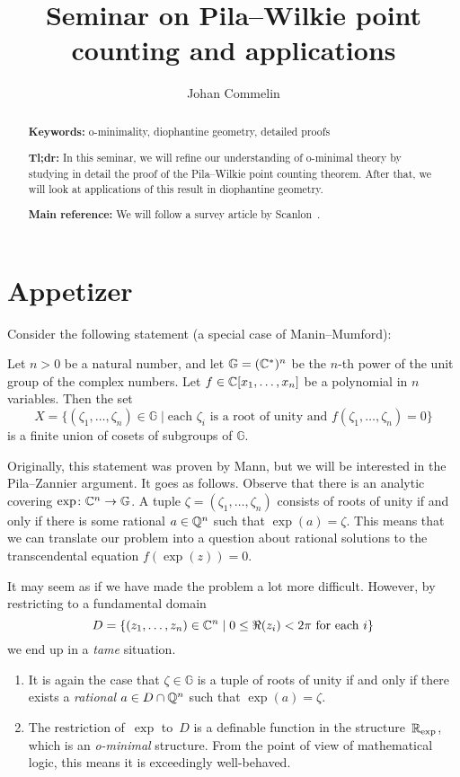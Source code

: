 \documentclass[10pt, a4paper]{amsart}
\title{Seminar on Pila--Wilkie point counting and applications}
\author{Johan Commelin}
\begin{document}
\maketitle

\begin{abstract}
  \textbf{Keywords:}
  o-minimality, diophantine geometry, detailed proofs
  
  \medskip\noindent
  \textbf{Tl;dr:}
  In this seminar,
  we will refine our understanding of o-minimal theory
  by studying in detail the proof of the Pila--Wilkie point counting theorem.
  After that, we will look at applications of this result in diophantine geometry.

  \medskip\noindent
  \textbf{Main reference:}
  We will follow a survey article by Scanlon~\cite{scanlon}.
\end{abstract}

\section*{Appetizer}
Consider the following statement (a special case of Manin--Mumford):

\begin{theorem}
  Let $n > 0$ be a natural number,
  and let $\mathbb G = (\mathbb{C}^*)^n$
  be the $n$-th power of the unit group of the complex numbers.
  Let $f \in \mathbb{C}[x_1, \dots, x_n]$ be a polynomial in $n$ variables.
  Then the set
  \[
    X = \{ (\zeta_1, \dots, \zeta_n) \in \mathbb G \mid
    \text{each $\zeta_i$ is a root of unity and $f(\zeta_1, \dots, \zeta_n) = 0$}\}
  \]
  is a finite union of cosets of subgroups of $\mathbb G$.
\end{theorem}

Originally, this statement was proven by Mann,
but we will be interested in the Pila--Zannier argument.
It goes as follows.
Observe that there is an analytic covering $\exp \colon \mathbb{C}^n \to \mathbb G$.
A tuple $\zeta = (\zeta_1, \dots, \zeta_n)$ consists of roots of unity
if and only if there is some rational $a \in \mathbb{Q}^n$ such that $\exp(a) = \zeta$.
This means that we can translate our problem into
a question about rational solutions to the transcendental equation $f(\exp(z)) = 0$.

It may seem as if we have made the problem a lot more difficult.
However, by restricting to a fundamental domain
\[
  D = \{ (z_1, \dots, z_n) \in \mathbb{C}^n \mid 0 \le \Re(z_i) < 2\pi \text{ for each $i$}\}
\]
we end up in a \emph{tame} situation.

\begin{enumerate}
  \item It is again the case that $\zeta \in \mathbb G$ is a tuple of roots of unity
    if and only if there exists a \emph{rational} $a \in D \cap \mathbb{Q}^n$ such that $\exp(a) = \zeta$.
  \item The restriction of~$\exp$ to~$D$ is a definable function in the structure~$\mathbb{R}_{\exp}$,
    which is an \emph{o-minimal} structure.
    From the point of view of mathematical logic, this means it is exceedingly well-behaved.
\end{enumerate}
\end{document}
